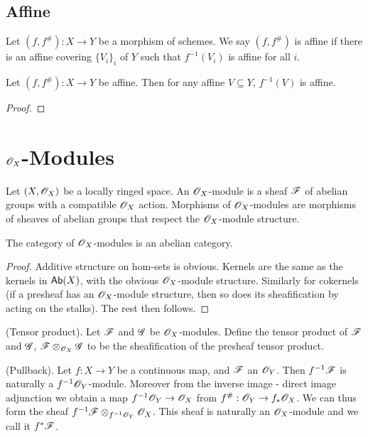 \documentclass{memoir}
\begin{document}
\subsection{Affine}
\begin{definition}
    Let $(f,f^\#):X\to Y$ be a morphism of schemes.
    We say $(f,f^\#)$ is affine if there is an affine covering $\{V_i\}_i$ of $Y$ such that $f^{-1}(V_i)$ is affine for all $i$.
\end{definition}
\begin{proposition}
    Let $(f,f^\#):X\to Y$ be affine.
    Then for any affine $V\subseteq Y$, $f^{-1}(V)$ is affine.
\end{proposition}
\begin{proof}

\end{proof}
\section{\texorpdfstring{$\mathscr{O}_X$}{OX}-Modules}
\begin{definition}
    Let $(X,\mathscr{O}_X)$ be a locally ringed space.
    An $\mathscr{O}_X$-module is a sheaf $\mathscr{F}$ of abelian groups with a compatible $\mathscr{O}_X$ action.
    Morphisms of $\mathscr{O}_X$-modules are morphisms of sheaves of abelian groups that respect the $\mathscr{O}_X$-module structure.
\end{definition}
\begin{thm}
    The category of $\mathscr{O}_X$-modules is an abelian category.
\end{thm}
\begin{proof}
    Additive structure on hom-sets is obvious.
    Kernels are the same as the kernels in ${\normalfont\mathsf{Ab}}(X)$, with the obvious $\mathscr{O}_X$-module structure.
    Similarly for cokernels (if a presheaf has an $\mathscr{O}_X$-module structure, then so does its sheafification by acting on the stalks).
    The rest then follows.
\end{proof}
\begin{definition}
    (Tensor product).
    Let $\mathscr{F}$ and $\mathscr{G}$ be $\mathscr{O}_X$-modules.
    Define the tensor product of $\mathscr{F}$ and $\mathscr{G}$, $\mathscr{F}\otimes_{\mathscr{O}_X}\mathscr{G}$ to be the sheafification of the presheaf tensor product.
\end{definition}
\begin{definition}
    (Pullback).
    Let $f:X\to Y$ be a continuous map, and $\mathscr{F}$ an $\mathscr{O}_Y$.
    Then $f^{-1}\mathscr{F}$ is naturally a $f^{-1}\mathscr{O}_Y$-module.
    Moreover from the inverse image - direct image adjunction we obtain a map $f^{-1}\mathscr{O}_Y\to \mathscr{O}_X$ from $f^\#:\mathscr{O}_Y\to f_*\mathscr{O}_X$.
    We can thus form the sheaf $f^{-1}\mathscr{F}\otimes_{f^{-1}\mathscr{O}_Y}\mathscr{O}_X$.
    This sheaf is naturally an $\mathscr{O}_X$-module and we call it $f^*\mathscr{F}$.
\end{definition}
\end{document}
